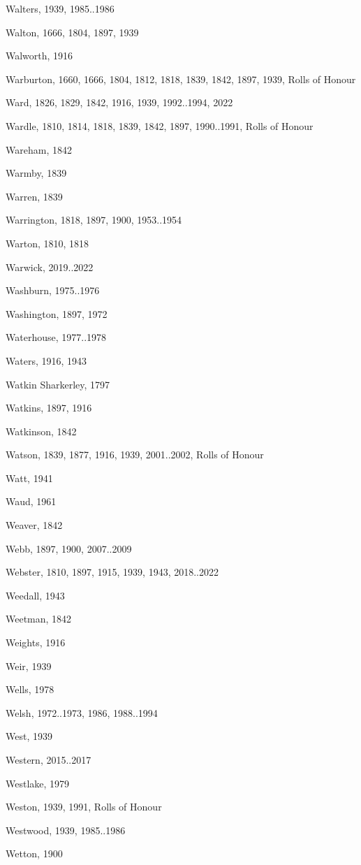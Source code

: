 \begin{theindex}
\item Walters, 1939, 1985..1986
\item Walton, 1666, 1804, 1897, 1939
\item Walworth, 1916
\item Warburton, 1660, 1666, 1804, 1812, 1818, 1839, 1842, 1897, 1939, Rolls of Honour
\item Ward, 1826, 1829, 1842, 1916, 1939, 1992..1994, 2022
\item Wardle, 1810, 1814, 1818, 1839, 1842, 1897, 1990..1991, Rolls of Honour
\item Wareham, 1842
\item Warmby, 1839
\item Warren, 1839
\item Warrington, 1818, 1897, 1900, 1953..1954
\item Warton, 1810, 1818
\item Warwick, 2019..2022
\item Washburn, 1975..1976
\item Washington, 1897, 1972
\item Waterhouse, 1977..1978
\item Waters, 1916, 1943
\item Watkin Sharkerley, 1797
\item Watkins, 1897, 1916
\item Watkinson, 1842
\item Watson, 1839, 1877, 1916, 1939, 2001..2002, Rolls of Honour
\item Watt, 1941
\item Waud, 1961
\item Weaver, 1842
\item Webb, 1897, 1900, 2007..2009
\item Webster, 1810, 1897, 1915, 1939, 1943, 2018..2022
\item Weedall, 1943
\item Weetman, 1842
\item Weights, 1916
\item Weir, 1939
\item Wells, 1978
\item Welsh, 1972..1973, 1986, 1988..1994
\item West, 1939
\item Western, 2015..2017
\item Westlake, 1979
\item Weston, 1939, 1991, Rolls of Honour
\item Westwood, 1939, 1985..1986
\item Wetton, 1900

\end{theindex}
